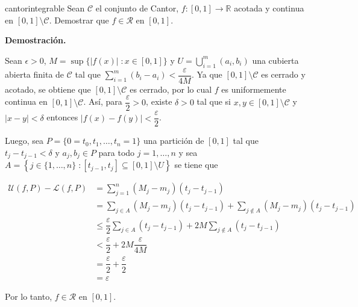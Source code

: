 \documentclass[12pt]{article}
\newenvironment{ejercicio}[1]{\begin{ejer}[breakable, pad at break = 5mm, leftrule = 0.7mm, rightrule = 0.7mm, right = 2mm, left = 2mm, enlarge bottom finally by = 3mm, fontlower = \setlength{\parskip}{2mm}]{}{#1}}{\end{ejer}}
\newcommand{\talque}{\; \mathbf{\colon}}
\newcommand{\real}{\mathbb{R}}
\begin{document}
	\begin{ejercicio}{cantorintegrable}
		Sean $ \mathcal{C} $ el conjunto de Cantor, $ f \colon [0,1] \to \real $ acotada y continua en $ [0,1] \setminus \mathcal{C} $. Demostrar que $ f \in \mathcal{R} $ en $ [0,1] $.

		\tcblower

		\textbf{Demostración.}

		Sean $ \epsilon > 0 $, $ M = \sup \bigl\lbrace \lvert f(x) \rvert \talque x \in [0,1] \bigr\rbrace $ y $ \displaystyle U = \bigcup_{i=1}^m (a_i, b_i) $ una cubierta abierta finita de $ \mathcal{C} $ tal que $ \displaystyle \sum_{i=1}^{m} (b_i - a_i) < \dfrac{\varepsilon}{4M} $. Ya que $ [0,1] \setminus \mathcal{C} $ es cerrado y acotado, se obtiene que $ [0,1] \setminus \mathcal{C} $ es cerrado, por lo cual $ f $ es uniformemente continua en $ [0,1] \setminus \mathcal{C} $. Así, para $ \dfrac{\varepsilon}{2} > 0 $, existe $ \delta > 0 $ tal que si $ x, y \in [0,1] \setminus \mathcal{C} $ y $ \lvert x - y \rvert < \delta $ entonces $ \lvert f(x) - f(y) \rvert < \dfrac{\varepsilon}{2} $.

		Luego, sea $ P = \lbrace 0 = t_0, t_1, \ldots, t_n = 1 \rbrace $ una partición de $ [0,1] $ tal que $ t_j - t_{j-1} < \delta $ y $ a_j, b_j \in P $ para todo $ j = 1, \ldots, n $ y sea $ A = \left\lbrace j \in \lbrace 1, \ldots, n \rbrace \talque [t_{j-1}, t_j] \subseteq [0,1] \setminus U \right\rbrace $ se tiene que 

		\begin{align*}
			\mathcal{U} (f, P) - \mathcal{L} (f, P) &= \sum_{j=1}^{n} (M_j - m_j)(t_j - t_{j-1}) \\
			&= \sum_{j \in A} (M_j - m_j)(t_j - t_{j-1}) + \sum_{j \notin A} (M_j - m_j)(t_j - t_{j-1}) \\
			&\leq \dfrac{\varepsilon}{2} \sum_{j \in A} (t_j - t_{j-1}) + 2M \sum_{j \notin A} (t_j - t_{j-1}) \\
			&< \dfrac{\varepsilon}{2} + 2M \dfrac{\varepsilon}{4M} \\
			&= \dfrac{\varepsilon}{2} + \dfrac{\varepsilon}{2} \\
			&= \varepsilon
		\end{align*}

		Por lo tanto, $ f \in \mathcal{R} $ en $ [0,1] $.
	\end{ejercicio}
\end{document}
